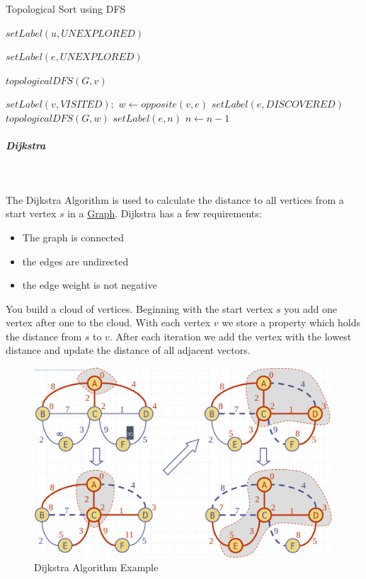 \documentclass[11pt,twoside,twocolumn,landscape]{article}
\begin{document}
\begin{algorithm}
  \caption{Topological Sort using DFS}
  \begin{algorithmic}[1]
    \State $setLabel(u, UNEXPLORED)$
    \EndFor

    \State $setLabel(e, UNEXPLORED)$
    \EndFor

    \State $topologicalDFS(G, v)$
    \EndIf
    \EndFor
    \EndProcedure
  \end{algorithmic}
  \begin{algorithmic}[1]
    \State $setLabel(v, VISITED);$
    \State $w \gets opposite(v,e)$
    \State $setLabel(e, DISCOVERED)$
    \State $topologicalDFS(G, w)$
    \Else
    \State $setLabel(e, n)$
    \EndIf
    \EndIf
    \EndFor
    \State $n \gets n - 1$
    \EndProcedure
  \end{algorithmic}
\end{algorithm}

\subparagraph{Dijkstra} \
\label{sec:orgb493fbf}

The Dijkstra Algorithm is used to calculate the distance to all vertices from a start vertex \(s\) in a \href{../../../roam/20220201163000-graph.org}{Graph}.
Dijkstra has a few requirements:
\begin{itemize}
\item The graph is connected
\item the edges are undirected
\item the edge weight is not negative
\end{itemize}


You build a cloud of vertices.
Beginning with the start vertex \(s\) you add one vertex after one to the cloud.
With each vertex \(v\) we store a property which holds the distance from \(s\) to \(v\).
After each iteration we add the vertex with the lowest distance and update the distance of all adjacent vectors.


\begin{figure}[htbp]
\centering
\includegraphics[width=.9\linewidth]{img/dijkstra_algorithm_example.png}
\caption{\label{fig:orgb13d651}Dijkstra Algorithm Example}
\end{figure}
\end{document}
